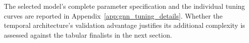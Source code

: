 \noindent
The selected model's complete parameter specification and the individual tuning curves are reported in Appendix~\ref{app:gnn_tuning_details}. Whether the temporal architecture's validation advantage justifies its additional complexity is assessed against the tabular finalists in the next section.
